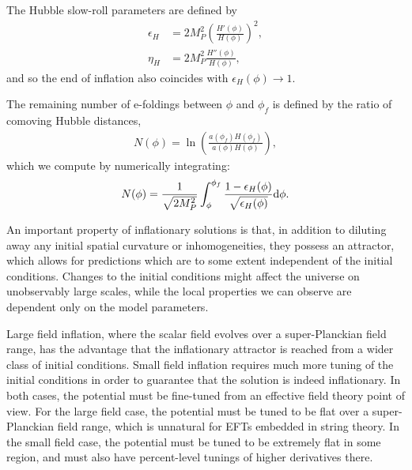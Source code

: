 \documentclass[aps,amsfonts,amsmath,prd,preprint,nofootinbib,superscriptaddress]{revtex4}
\newcommand{\MMp}{{M_P^2}}
\newcommand{\rmd}{{\rm d}}
\begin{document}
The Hubble slow-roll parameters are defined by
\begin{align}
\epsilon_H &= 2\MMp \left(\frac{H'(\phi)}{H(\phi)}\right)^2,\\
\eta_H &= 2\MMp \frac{H''(\phi)}{H(\phi)},
\end{align}
and so the end of inflation also coincides with ${\epsilon_H(\phi) \to 1}$.  

The remaining number of e-foldings between $\phi$ and $\phi_f$ is defined by the ratio of comoving Hubble distances, 
\begin{align}
N(\phi) = \ln\left(\frac{a(\phi_f) H(\phi_f)}{a(\phi) H(\phi)}\right),
\end{align}
which we compute by numerically integrating:
\begin{align}
N(\phi) = \frac{1}{\sqrt{2\MMp}}\int_{\phi}^{\phi_f} \frac{1-\epsilon_H(\phi)}{\sqrt{\epsilon_H(\phi)}}\rmd \phi .
\end{align}



















An important property of inflationary solutions is that, in addition to diluting away any initial spatial curvature or inhomogeneities, 
they possess an attractor, which allows for predictions which are to some extent independent of the initial conditions.  
Changes to the initial conditions might affect the universe on unobservably large scales, while the local properties we can observe 
are dependent only on the model parameters.

Large field inflation, where the scalar field evolves over a super-Planckian field range, has the advantage that the inflationary attractor 
is reached from a wider class of initial conditions.  Small field inflation requires much more tuning of the initial conditions in order to 
guarantee that the solution is indeed inflationary.  In both cases, the potential must be fine-tuned from an effective field theory point of view.  
For the large field case, the potential must be tuned to be flat over a super-Planckian field range, which is unnatural \cite{banks,swampland} for 
EFTs embedded in string theory.  In the small field case, the potential must be tuned to be extremely flat in some region, 
and must also have percent-level tunings of higher derivatives there.
\end{document}
